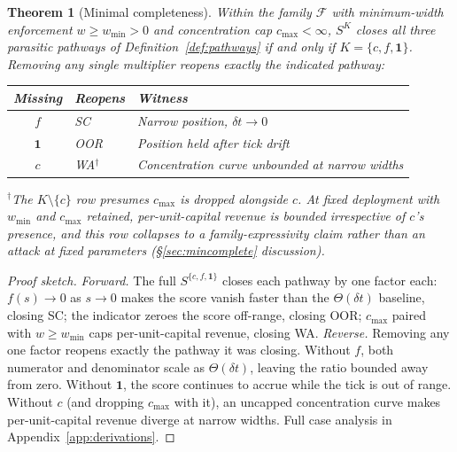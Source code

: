 \documentclass[11pt,a4paper]{article}
\theoremstyle{definition}
\theoremstyle{plain}
\newtheorem{theorem}{Theorem}
\theoremstyle{remark}
\begin{document}
\begin{theorem}[Minimal completeness]\label{thm:mincomplete}
Within the family $\mathcal{F}$ with minimum-width enforcement $w \geq w_{\min} > 0$ and concentration cap $c_{\max} < \infty$, $S^K$ closes all three parasitic pathways of Definition~\ref{def:pathways} if and only if $K = \{c, f, \mathbf{1}\}$. Removing any single multiplier reopens exactly the indicated pathway:
\begin{center}
\begin{tabular}{@{}cll@{}}
\toprule
Missing & Reopens & Witness \\
\midrule
$f$ & SC & Narrow position, $\delta t \to 0$ \\
$\mathbf{1}$ & OOR & Position held after tick drift \\
$c$ & WA$^\dagger$ & Concentration curve unbounded at narrow widths \\
\bottomrule
\end{tabular}
\end{center}
$^\dagger$The $K \setminus \{c\}$ row presumes $c_{\max}$ is dropped alongside $c$. At fixed deployment with $w_{\min}$ and $c_{\max}$ retained, per-unit-capital revenue is bounded irrespective of $c$'s presence, and this row collapses to a family-expressivity claim rather than an attack at fixed parameters (\S\ref{sec:mincomplete} discussion).
\end{theorem}

\begin{proof}[Proof sketch]
\emph{Forward.} The full $S^{\{c,f,\mathbf{1}\}}$ closes each pathway by one factor each: $f(s) \to 0$ as $s \to 0$ makes the score vanish faster than the $\Theta(\delta t)$ baseline, closing SC; the indicator zeroes the score off-range, closing OOR; $c_{\max}$ paired with $w \geq w_{\min}$ caps per-unit-capital revenue, closing WA. \emph{Reverse.} Removing any one factor reopens exactly the pathway it was closing. Without $f$, both numerator and denominator scale as $\Theta(\delta t)$, leaving the ratio bounded away from zero. Without $\mathbf{1}$, the score continues to accrue while the tick is out of range. Without $c$ (and dropping $c_{\max}$ with it), an uncapped concentration curve makes per-unit-capital revenue diverge at narrow widths. Full case analysis in Appendix~\ref{app:derivations}.
\end{proof}
\end{document}
